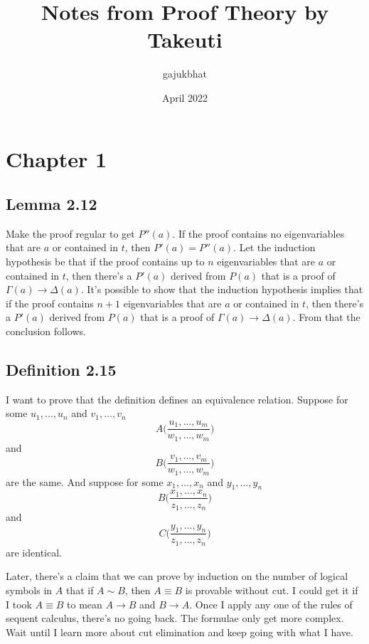 \documentclass{article}
\title{Notes from Proof Theory by Takeuti}
\author{gajukbhat}
\date{April 2022}
\begin{document}
\maketitle

\section{Chapter 1}
\subsection{Lemma 2.12}
Make the proof regular to get \(P''(a)\). If the proof contains no eigenvariables that are \(a\) or contained in \(t\), then \(P'(a) = P''(a)\).
Let the induction hypothesis be that if the proof contains up to \(n\) eigenvariables that are \(a\) or contained in \(t\), then there's a \(P'(a)\) derived from \(P(a)\) that is a proof of \(\Gamma(a) \rightarrow \Delta(a)\). It's possible to show that the induction hypothesis implies that if the proof contains \(n + 1\) eigenvariables that are \(a\) or contained in \(t\), then there's a \(P'(a)\) derived from \(P(a)\) that is a proof of \(\Gamma(a) \rightarrow \Delta(a)\).
From that the conclusion follows.

\subsection{Definition 2.15}
I want to prove that the definition defines an equivalence relation. Suppose for some \(u_1, \ldots, u_n\) and \(v_1, \ldots, v_n\)
\[
A\biggl(\frac{u_1, \ldots, u_m}{w_1, \ldots, w_m}\biggr)
\]
and
\[
B\biggl(\frac{v_1, \ldots, v_m}{w_1, \ldots, w_m}\biggr)
\]
are the same. And suppose for some \(x_1, \ldots, x_n\) and \(y_1, \ldots, y_n\)
\[
B\biggl(\frac{x_1, \ldots, x_n}{z_1, \ldots, z_n}\biggr)
\]
and
\[
C\biggl(\frac{y_1, \ldots, y_n}{z_1, \ldots, z_n}\biggr)
\]
are identical.

Later, there's a claim that we can prove by induction on the number of logical symbols in \(A\) that if \(A \sim B\), then \(A \equiv B\) is provable without cut.
I could get it if I took \(A \equiv B\) to mean \(A \rightarrow B\) and \(B \rightarrow A\).
Once I apply any one of the rules of sequent calculus, there's no going back. The formulae only get more complex.
Wait until I learn more about cut elimination and keep going with what I have.
\end{document}
